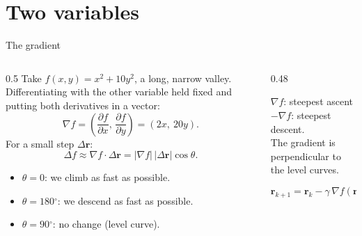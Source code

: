 \documentclass[aspectratio=169,10pt]{beamer}
\newcommand{\grados}{\ensuremath{^\circ}}
\begin{document}
\section{Two variables}

\begin{frame}{The gradient}
  \begin{columns}[T]
    \begin{column}{0.5\textwidth}
      Take $f(x,y) = x^2 + 10y^2$, a long, narrow valley. Differentiating with the other variable held fixed and putting both derivatives in a vector:
      \[ \nabla f = \left(\frac{\partial f}{\partial x},\, \frac{\partial f}{\partial y}\right) = (2x,\ 20y). \]
      For a small step $\Delta\mathbf r$:
      \[ \Delta f \approx \nabla f\cdot\Delta\mathbf r = |\nabla f|\,|\Delta\mathbf r|\cos\theta . \]
      \begin{itemize}
        \item $\theta = 0$: we climb as fast as possible.
        \item $\theta = 180\grados$: we descend as fast as possible.
        \item $\theta = 90\grados$: no change (level curve).
      \end{itemize}
    \end{column}
    \begin{column}{0.48\textwidth}
      \centering
      \smallskip

      {\scriptsize \textcolor{azul}{$\nabla f$}: steepest ascent \quad \textcolor{cafe}{$-\nabla f$}: steepest descent.\\ The gradient is perpendicular to the level curves.}
      \medskip

      \begin{ecuacion}
        \[ \mathbf r_{k+1} = \mathbf r_k - \gamma\,\nabla f(\mathbf r_k) \]
      \end{ecuacion}
    \end{column}
  \end{columns}
\end{frame}
\end{document}
